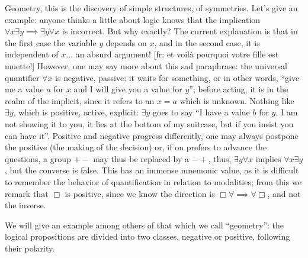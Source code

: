 \documentclass{article}
\begin{document}
Geometry, this is the discovery of simple structures, of symmetries. Let's give an example: anyone thinks a little about logic knows that the implication $\forall x \exists y \implies \exists y \forall x$ is incorrect. But why exactly? The current explanation is that in the first case the variable $y$ depends on $x$, and in the second case, it is independent of $x$... an absurd argument! [fr: et voilà pourquoi votre fille est muette!] However, one may say more about this sad paraphrase: the universal quantifier $\forall x$ is negative, passive: it waits for something, or in other words, \enquote{give me a value $a$ for $x$ and I will give you a value for $y$}; before acting, it is in the realm of the implicit, since it refers to an $x=a$ which is unknown. Nothing like $\exists y$, which is positive, active, explicit: $\exists y$ goes to say \enquote{I have a value $b$ for $y$, I am not showing it to you, it lies at the bottom of my suitcase, but if you insist you can have it}. Positive and negative progress differently, one may always postpone the positive (the making of the decision) or, if on prefers to advance the questions, a group $+-$ may thus be replaced by a $-+$, thus, $\exists y \forall x$ implies $\forall x \exists y$, but the converse is false. This has an immense mnemonic value, as it is difficult to remember the behavior of quantification in relation to modalities; from this we remark that $\Box$ is positive, since we know the direction is $\Box\forall\implies\forall\Box$, and not the inverse.

We will give an example among others of that which we call \enquote{geometry}: the logical propositions are divided into two classes, negative or positive, following their polarity.
\end{document}
